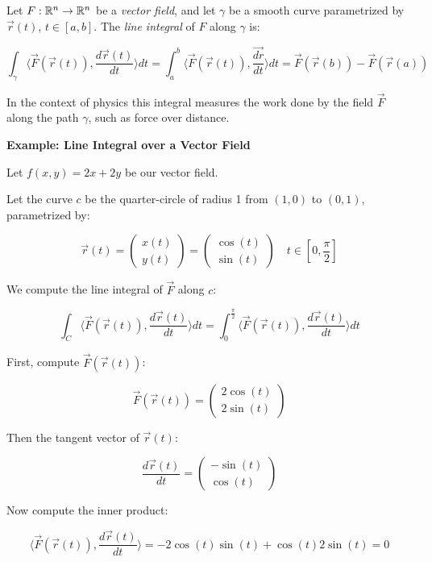 Let \( F : \mathbb{R}^n \to \mathbb{R}^n \) be a \emph{vector field}, and let \( \gamma \) be a 
smooth curve parametrized by \( \vec{r}(t) \), \( t \in [a, b] \). 
The \emph{line integral} of \(F\) along \( \gamma \) is:

\[
    \int_\gamma \langle \vec{F}(\vec{r}(t)), \frac{d\vec{r}(t)}{dt} \rangle dt = 
    \int_a^b \langle \vec{F}(\vec{r}(t)), \frac{\vec{dr}}{dt} \rangle dt = \vec{F}(\vec{r}(b)) 
    - \vec{F}(\vec{r}(a))
\]

In the context of physics this integral measures the work done by the field \( \vec{F} \) 
along the path \( \gamma \), such as force over distance.

\textbf{Example: Line Integral over a Vector Field}

Let \( f(x, y) = 2x + 2y \) be our vector field. 

Let the curve \(c\) be the quarter-circle of radius 1 from \( (1, 0) \) to \( (0, 1) \), 
parametrized by:

\[
    \vec{r}(t) = 
    \begin{pmatrix}
        x(t) \\ y(t)
    \end{pmatrix}
    =
    \begin{pmatrix}
    \cos(t) \\ \sin(t)
    \end{pmatrix}  
    \quad t \in \left[0, \frac{\pi}{2}\right]
\]

We compute the line integral of \( \vec{F} \) along \(c\):

\[
    \int_C \langle \vec{F}(\vec{r}(t)), \frac{d \vec{r}(t)}{dt}\rangle dt = 
    \int_0^{\frac{\pi}{2}} \langle\vec{F}(\vec{r}(t)), \frac{d \vec{r}(t)}{dt} \rangle dt
\]

First, compute \(\vec{F}(\vec{r}(t))\):

\[
    \vec{F}(\vec{r}(t)) = 
    \begin{pmatrix}
        2\cos(t) \\ 
        2\sin(t)
    \end{pmatrix}
\]

Then the tangent vector of \(\vec{r}(t)\):

\[
    \frac{d \vec{r}(t)}{dt} = 
    \begin{pmatrix}
    -\sin(t) \\ 
    \cos(t)
    \end{pmatrix}
\]

Now compute the inner product:

\[
    \langle\vec{F}(\vec{r}(t)), \frac{d \vec{r}(t)}{dt}\rangle =
    -2\cos(t)\sin(t) + \cos(t)2\sin(t) = 0
\]

